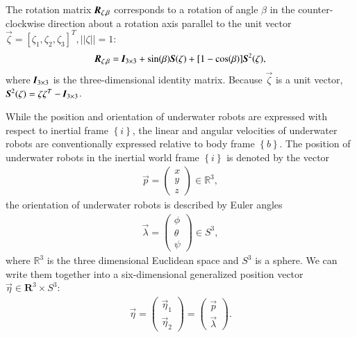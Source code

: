 The rotation matrix $\emph{\textbf{R}}_{\zeta,\bigskip \beta}$ corresponds to a rotation of angle $\beta$ in the counter-clockwise direction about a rotation axis parallel to the unit vector $\vec{\zeta}=[\zeta_{1}, \zeta_{2}, \zeta_{3}]^{T}, ||\zeta||=1$:
\begin{align}
 \emph{\textbf{R}}_{\zeta,\bigskip \beta}=\emph{\textbf{I}}_{3\times 3}+\sin(\beta)\emph{\textbf{S}}(\vec{\zeta})+[1-\cos(\beta)]\emph{\textbf{S}}^{2}(\vec{\zeta}), \label{EQ:BS3}
 \end{align} 
where $\emph{\textbf{I}}_{3\times 3}$ is the three-dimensional identity matrix. Because $\vec{\zeta}$ is a unit vector, $\emph{\textbf{S}}^{2}(\vec{\zeta})=\vec{\zeta}\vec{\zeta}^{T}-\emph{\textbf{I}}_{3\times 3}$.

While the position and orientation of underwater robots are expressed with respect to inertial frame $\left\{ i \right\}$, the linear and angular velocities of underwater robots are conventionally expressed relative to body frame $\left\{ b \right\}$.  
The position of underwater robots in the inertial world frame $\left\{ i \right\}$ is denoted by the vector 
\begin{align}
\vec{p}=
\begin{pmatrix}
x\\y\\z
\end{pmatrix}
\in 
\mathbb{R}^{3},
\end{align}
the orientation of underwater robots is described by Euler angles
\begin{align}
\vec{\lambda}=
\begin{pmatrix}
\phi \\ \theta\\ \psi
\end{pmatrix}
\in 
\mathit{S}^{3},
\end{align}
where $\mathbb{R}^{3}$ is the three dimensional Euclidean space and $\mathit{S}^{3}$ is a sphere. We can write them together into a six-dimensional generalized position vector $\vec{\eta}\in \mathbf{R}^{3}\times\mathit{S}^{3}$:
\begin{align}
\vec{\eta}=
\begin{pmatrix}
\vec{\eta}_{1}\\
\vec{\eta}_{2}
\end{pmatrix}=
\begin{pmatrix}
\vec{p} \\
\vec{\lambda}
\end{pmatrix}.
\end{align}
 
